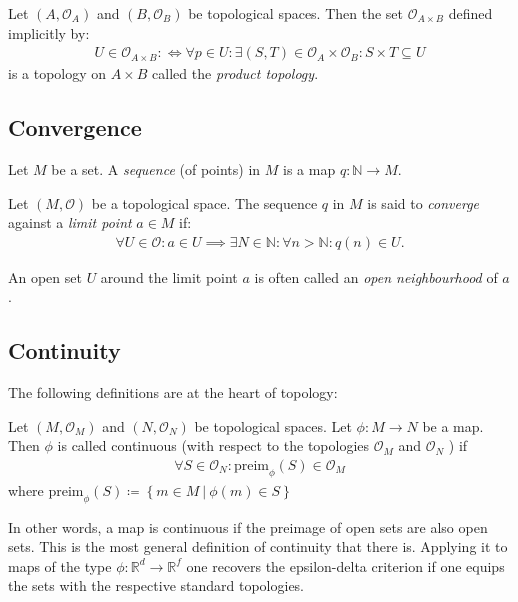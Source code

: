 \begin{definition}
    Let \((A, \mathcal{O} _A)\) and \((B, \mathcal{O} _B)\) be topological spaces. Then the set \(\mathcal{O} _{A \times B}\) defined implicitly by: \begin{align*}
        U \in \mathcal{O}_{A \times B}: \iff  \forall p \in U : \exists (S, T) \in \mathcal{O} _A \times \mathcal{O} _B : S \times T \subseteq U
    \end{align*}
    is a topology on \(A \times B\) called the \textit{product topology}. 
\end{definition}

\subsection{Convergence}
\begin{definition}[Sequence]
    Let \(M\) be a set. A \textit{sequence} (of points) in \(M\) is a map \(q : \mathbb{N} \to  M\).
\end{definition}

\begin{definition}[Convergence]
    Let \((M, \mathcal{O} )\) be a topological space. The sequence \(q\) in \(M\) is said to \textit{converge} against a \textit{limit point} \(a \in M\) if: \begin{align*}
        \forall U \in \mathcal{O} : a \in U \implies \exists N \in \mathbb{N} : \forall n > \mathbb{N} : q(n) \in U. 
    \end{align*}    
\end{definition}
\begin{remark}
    An open set \(U\) around the limit point \(a\) is often called an \textit{open neighbourhood} of \(a\). 
\end{remark}

\subsection{Continuity}
The following definitions are at the heart of topology:
\begin{definition}[Continuity]
    Let \((M, \mathcal{O} _M)\) and \((N, \mathcal{O} _N)\) be topological spaces. Let \(\phi : M \to N\) be a map. Then \(\phi \) is called continuous (with respect to the topologies \(\mathcal{O} _M\) and \(\mathcal{O} _N\)  ) if \begin{align*}
        \forall S \in \mathcal{O} _N : \text{preim}_{\phi} (S) \in \mathcal{O} _M 
    \end{align*}
    where \(\text{preim}_{\phi}(S) \coloneqq \left\{ m \in M\ \big|\ \phi (m) \in S \right\}  \) 
\end{definition}
In other words, a map is continuous if the preimage of open sets are also open sets. This is the most general definition of continuity that there is. Applying it to maps of the type \(\phi : \mathbb{R} ^d \to  \mathbb{R} ^f\) one recovers the epsilon-delta criterion if one equips the sets with the respective standard topologies.

